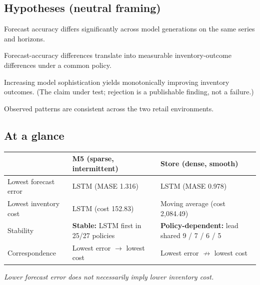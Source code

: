 \subsection*{Hypotheses (neutral framing)}
\begin{description}[leftmargin=!,labelwidth=2.2cm]
\item[H1.] Forecast accuracy differs significantly across model generations on
the same series and horizons.
\item[H2.] Forecast-accuracy differences translate into measurable
inventory-outcome differences under a common policy.
\item[H3.] Increasing model sophistication yields monotonically improving
inventory outcomes. (The claim under test; rejection is a publishable
finding, not a failure.)
\item[H4.] Observed patterns are consistent across the two retail environments.
\end{description}

\subsection*{At a glance}
\begin{center}
\begin{tabular}{p{3.2cm}p{5.4cm}p{5.4cm}}
\toprule
 & \textbf{M5 (sparse, intermittent)} & \textbf{Store (dense, smooth)} \\
\midrule
Lowest forecast error & LSTM (MASE 1.316) & LSTM (MASE 0.978) \\
Lowest inventory cost & LSTM (cost 152.83) & Moving average (cost 2,084.49) \\
Stability & \textbf{Stable:} LSTM first in 25/27 policies & \textbf{Policy-dependent:} lead shared 9 / 7 / 6 / 5 \\
Correspondence & Lowest error $\rightarrow$ lowest cost & Lowest error $\not\rightarrow$ lowest cost \\
\bottomrule
\end{tabular}
\end{center}
\begin{center}
\emph{Lower forecast error does not necessarily imply lower inventory cost.}
\end{center}
